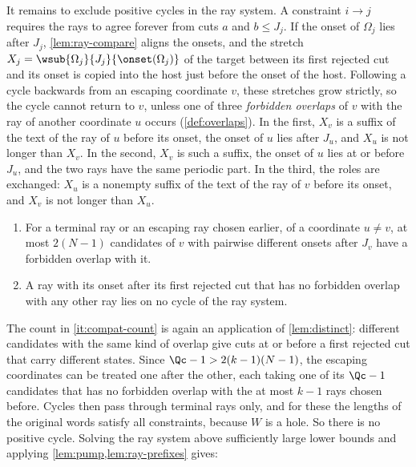 It remains to exclude positive cycles in the ray system. A constraint $i\to
j$ requires the rays to agree forever from cuts $a$ and $b\le J_j$. If the
onset of $\Omega_j$ lies after $J_j$, \cref{lem:ray-compare} aligns the
onsets, and the stretch $X_j=\wsub{\Omega_j}{J_j}{\onset(\Omega_j)}$ of the
target between its first rejected cut and its onset is copied into the host
just before the onset of the host. Following a cycle backwards from an
escaping coordinate $v$, these stretches grow strictly, so the cycle cannot
return to $v$, unless one of three \emph{forbidden overlaps} of $v$ with
the ray of another coordinate $u$ occurs (\cref{def:overlaps}). In the
first, $X_v$ is a suffix of the text of the ray of $u$ before its onset,
the onset of $u$ lies after $J_u$, and $X_u$ is not longer than $X_v$. In
the second, $X_v$ is such a suffix, the onset of $u$ lies at or before
$J_u$, and the two rays have the same periodic part. In the third, the
roles are exchanged: $X_u$ is a nonempty suffix of the text of the ray of
$v$ before its onset, and $X_v$ is not longer than $X_u$.

\begin{lemma}\label{lem:compatible}
\begin{enumerate}
\item\label{it:compat-count} For a terminal ray or an escaping ray chosen
  earlier, of a coordinate $u\ne v$, at most $2(N-1)$ candidates of $v$ with
  pairwise different onsets after $J_v$ have a forbidden overlap with it.
\item\label{it:compat-cycle} A ray with its onset after its first rejected
  cut that has no forbidden overlap with any other ray lies on no cycle of
  the ray system.
\end{enumerate}
\end{lemma}

The count in \eqref{it:compat-count} is again an application of
\cref{lem:distinct}: different candidates with the same kind of overlap give
cuts at or before a first rejected cut that carry different states. Since
$\Qc-1>2(k-1)(N-1)$, the escaping coordinates can be treated one after the
other, each taking one of its $\Qc-1$ candidates that has no forbidden
overlap with the at most $k-1$ rays chosen before. Cycles then pass through terminal rays only, and for these the
lengths of the original words satisfy all constraints, because $W$ is a hole.
So there is no positive cycle. Solving the ray system above sufficiently
large lower bounds and applying \cref{lem:pump,lem:ray-prefixes} gives:


